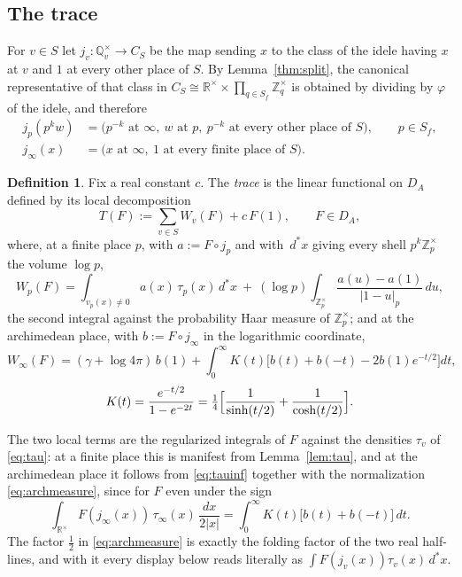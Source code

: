 \documentclass[11pt]{amsart}
\theoremstyle{definition}
\newtheorem{definition}[theorem]{Definition}
\theoremstyle{remark}
\newcommand{\R}{\mathbb R}
\newcommand{\Z}{\mathbb Z}
\newcommand{\Q}{\mathbb Q}
\newcommand{\dstar}{\,d^{*}}
\newcommand{\DA}{D_A}
\begin{document}
\subsection{The trace}

For $v\in S$ let $j_v:\Q_v^{\times}\to C_S$ be the map sending $x$ to the class
of the idele having $x$ at $v$ and $1$ at every other place of $S$.  By
Lemma~\ref{thm:split}, the canonical representative of that class in
$C_S\cong\R^{\times}\times\prod_{q\in S_f}\Z_q^{\times}$ is obtained by
dividing by $\varphi$ of the idele, and therefore
\begin{equation}\label{eq:slices}
\begin{aligned}
j_p(p^{k}w)&=\bigl(p^{-k}\text{ at }\infty,\ w\text{ at }p,\
p^{-k}\text{ at every other place of }S\bigr),\qquad p\in S_f,\\
j_{\infty}(x)&=\bigl(x\text{ at }\infty,\ 1\text{ at every finite place of }S
\bigr).
\end{aligned}
\end{equation}

\begin{definition}\label{def:trace}
Fix a real constant $c$.  The \emph{trace} is the linear functional on $\DA$
defined by its local decomposition
\begin{equation}\label{eq:tracedef}
T(F):=\sum_{v\in S}W_v(F)+c\,F(1),\qquad F\in\DA ,
\end{equation}
where, at a finite place $p$, with $a:=F\circ j_p$ and with $\dstar x$ giving
every shell $p^{k}\Z_p^{\times}$ the volume $\log p$,
\begin{equation}\label{eq:Wp}
W_p(F)=\int_{v_p(x)\neq0}a(x)\,\tau_p(x)\dstar x
\ +\ (\log p)\int_{\Z_p^{\times}}\frac{a(u)-a(1)}{|1-u|_p}\,du,
\end{equation}
the second integral against the probability Haar measure of
$\Z_p^{\times}$; and at the archimedean place, with $b:=F\circ j_{\infty}$ in
the logarithmic coordinate,
\begin{equation}\label{eq:Winf}
W_{\infty}(F)=(\gamma+\log4\pi)\,b(1)
+\int_0^{\infty}K(t)\bigl[b(t)+b(-t)-2b(1)e^{-t/2}\bigr]dt,
\end{equation}
\[
K(t)=\frac{e^{-t/2}}{1-e^{-2t}}
=\tfrac14\Bigl[\frac{1}{\sinh(t/2)}+\frac{1}{\cosh(t/2)}\Bigr].
\]
\end{definition}

The two local terms are the regularized integrals of $F$ against the densities
$\tau_v$ of \eqref{eq:tau}: at a finite place this is manifest from
Lemma~\ref{lem:tau}, and at the archimedean place it follows from
\eqref{eq:tauinf} together with the normalization \eqref{eq:archmeasure}, since
for $F$ even under the sign
\[
\int_{\R^{\times}}F(j_{\infty}(x))\,\tau_{\infty}(x)\,\frac{dx}{2|x|}
=\int_0^{\infty}K(t)\bigl[b(t)+b(-t)\bigr]\,dt .
\]
The factor $\tfrac12$ in \eqref{eq:archmeasure} is exactly the folding factor
of the two real half-lines, and with it every display below reads literally as
$\int F(j_v(x))\tau_v(x)\dstar x$.
\end{document}
